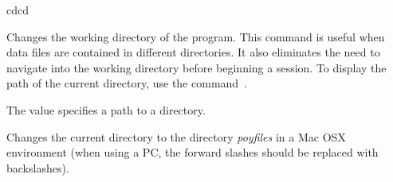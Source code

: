 \begin{command}{cd}{cd}

	\syntax{\obligatory{(\poystring)}}

	\begin{poydescription}
            Changes the working directory of the program. This command is useful
            when data files are contained in different directories. It also
            eliminates the need to navigate into the working directory before
            beginning a \poy session. To display the path of the current
            directory, use the command~.
	\end{poydescription}

	\begin{arguments}
            {The value specifies a path to a directory.}
            {}
	\end{arguments}
	
	\begin{poyexamples}

            {Changes the current directory to the directory \emph{poyfiles} in a Mac OSX 
            environment (when using a PC, the forward slashes should be replaced with backslashes).}
            

    \end{poyexamples}

    \begin{poyalso}
    \end{poyalso}

\end{command}

   
